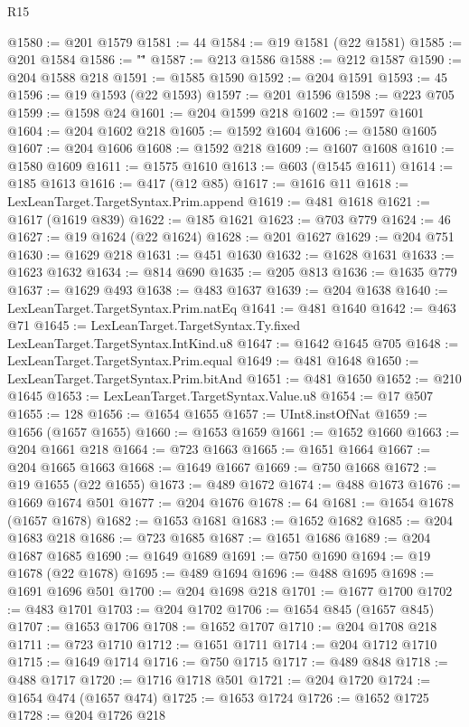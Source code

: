 \begin{lexlean}{R15}
\begin{coremodule}
{{{{{{@1580 := @201 @1579
@1581 := 44
@1584 := @19 @1581 (@22 @1581)
@1585 := @201 @1584
@1586 := "\""
@1587 := @213 @1586
@1588 := @212 @1587
@1590 := @204 @1588 @218
@1591 := @1585 @1590
@1592 := @204 @1591
@1593 := 45
@1596 := @19 @1593 (@22 @1593)
@1597 := @201 @1596
@1598 := @223 @705
@1599 := @1598 @24
@1601 := @204 @1599 @218
@1602 := @1597 @1601
@1604 := @204 @1602 @218
@1605 := @1592 @1604
@1606 := @1580 @1605
@1607 := @204 @1606
@1608 := @1592 @218
@1609 := @1607 @1608
@1610 := @1580 @1609
@1611 := @1575 @1610
@1613 := @603 (@1545 @1611)
@1614 := @185 @1613
@1616 := @417 (@12 @85)
@1617 := @1616 @11
@1618 := LexLeanTarget.TargetSyntax.Prim.append
@1619 := @481 @1618
@1621 := @1617 (@1619 @839)
@1622 := @185 @1621
@1623 := @703 @779
@1624 := 46
@1627 := @19 @1624 (@22 @1624)
@1628 := @201 @1627
@1629 := @204 @751
@1630 := @1629 @218
@1631 := @451 @1630
@1632 := @1628 @1631
@1633 := @1623 @1632
@1634 := @814 @690
@1635 := @205 @813
@1636 := @1635 @779
@1637 := @1629 @493
@1638 := @483 @1637
@1639 := @204 @1638
@1640 := LexLeanTarget.TargetSyntax.Prim.natEq
@1641 := @481 @1640
@1642 := @463 @71
@1645 := LexLeanTarget.TargetSyntax.Ty.fixed LexLeanTarget.TargetSyntax.IntKind.u8
@1647 := @1642 @1645 @705
@1648 := LexLeanTarget.TargetSyntax.Prim.equal
@1649 := @481 @1648
@1650 := LexLeanTarget.TargetSyntax.Prim.bitAnd
@1651 := @481 @1650
@1652 := @210 @1645
@1653 := LexLeanTarget.TargetSyntax.Value.u8
@1654 := @17 @507
@1655 := 128
@1656 := @1654 @1655
@1657 := UInt8.instOfNat
@1659 := @1656 (@1657 @1655)
@1660 := @1653 @1659
@1661 := @1652 @1660
@1663 := @204 @1661 @218
@1664 := @723 @1663
@1665 := @1651 @1664
@1667 := @204 @1665 @1663
@1668 := @1649 @1667
@1669 := @750 @1668
@1672 := @19 @1655 (@22 @1655)
@1673 := @489 @1672
@1674 := @488 @1673
@1676 := @1669 @1674 @501
@1677 := @204 @1676
@1678 := 64
@1681 := @1654 @1678 (@1657 @1678)
@1682 := @1653 @1681
@1683 := @1652 @1682
@1685 := @204 @1683 @218
@1686 := @723 @1685
@1687 := @1651 @1686
@1689 := @204 @1687 @1685
@1690 := @1649 @1689
@1691 := @750 @1690
@1694 := @19 @1678 (@22 @1678)
@1695 := @489 @1694
@1696 := @488 @1695
@1698 := @1691 @1696 @501
@1700 := @204 @1698 @218
@1701 := @1677 @1700
@1702 := @483 @1701
@1703 := @204 @1702
@1706 := @1654 @845 (@1657 @845)
@1707 := @1653 @1706
@1708 := @1652 @1707
@1710 := @204 @1708 @218
@1711 := @723 @1710
@1712 := @1651 @1711
@1714 := @204 @1712 @1710
@1715 := @1649 @1714
@1716 := @750 @1715
@1717 := @489 @848
@1718 := @488 @1717
@1720 := @1716 @1718 @501
@1721 := @204 @1720
@1724 := @1654 @474 (@1657 @474)
@1725 := @1653 @1724
@1726 := @1652 @1725
@1728 := @204 @1726 @218
}}}}}}
\end{coremodule}
\end{lexlean}
